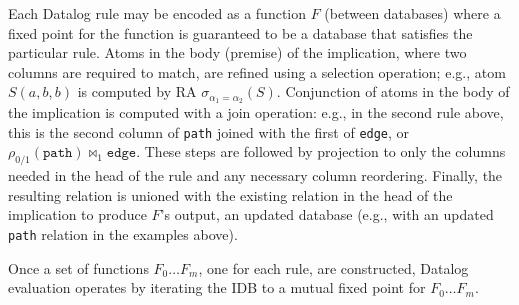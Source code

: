 Each Datalog rule may be encoded as a function $F$ (between databases) where a fixed point for the function is guaranteed to be a database that satisfies the particular rule. Atoms in the body (premise) of the implication, where two columns are required to match, are refined using a selection operation; e.g., atom $S(a,b,b)$ is computed by RA $\sigma_{\alpha_1 = \alpha_2}(S)$. Conjunction of atoms in the body of the implication is computed with a join operation: e.g., in the second rule above, this is the second column of \texttt{path} joined with the first of \texttt{edge}, or $\rho_{0 / 1}(\texttt{path}) \bowtie_1 \texttt{edge}$. These steps are followed by projection to only the columns needed in the head of the rule and any necessary column reordering. Finally, the resulting relation is unioned with the existing relation in the head of the implication to produce $F$'s output, an updated database (e.g., with an updated \texttt{path} relation in the examples above).

Once a set of functions $F_0 \ldots F_m$, one for each rule, are constructed, Datalog evaluation operates by iterating the IDB to a mutual fixed point for $F_0 \ldots F_m$.


